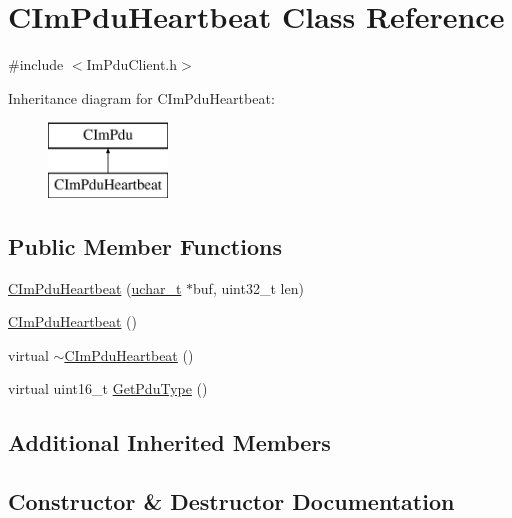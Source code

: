 \hypertarget{class_c_im_pdu_heartbeat}{}\section{C\+Im\+Pdu\+Heartbeat Class Reference}
\label{class_c_im_pdu_heartbeat}


{\ttfamily \#include $<$Im\+Pdu\+Client.\+h$>$}

Inheritance diagram for C\+Im\+Pdu\+Heartbeat\+:\begin{figure}[H]
\begin{center}
\leavevmode
\includegraphics[height=2.000000cm]{class_c_im_pdu_heartbeat}
\end{center}
\end{figure}
\subsection*{Public Member Functions}
\begin{DoxyCompactItemize}
\item 
\hyperlink{class_c_im_pdu_heartbeat_a6b7e8c43362573928ad70d1e92dffc25}{C\+Im\+Pdu\+Heartbeat} (\hyperlink{base_2ostype_8h_a124ea0f8f4a23a0a286b5582137f0b8d}{uchar\+\_\+t} $\ast$buf, uint32\+\_\+t len)
\item 
\hyperlink{class_c_im_pdu_heartbeat_a7045807e6fedc1d92e569298b6ace64a}{C\+Im\+Pdu\+Heartbeat} ()
\item 
virtual \hyperlink{class_c_im_pdu_heartbeat_a89d3cc628032aef6bbeb451884eae929}{$\sim$\+C\+Im\+Pdu\+Heartbeat} ()
\item 
virtual uint16\+\_\+t \hyperlink{class_c_im_pdu_heartbeat_a6d705f91ef31d2cf1a24b5b4d7e7b23d}{Get\+Pdu\+Type} ()
\end{DoxyCompactItemize}
\subsection*{Additional Inherited Members}


\subsection{Constructor \& Destructor Documentation}
\hypertarget{class_c_im_pdu_heartbeat_a6b7e8c43362573928ad70d1e92dffc25}{}
